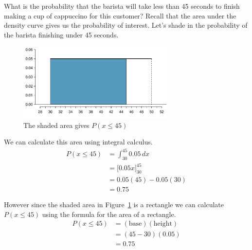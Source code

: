 \begin{example}{What is the probability that the barista will take less than 45 seconds to finish making a cup of cappuccino for this customer?}\label{UniformBaristaExampleLess45}
Recall that the area under the density curve gives us the probability of interest.
Let's shade in the probability of the barista finishing under 45 seconds.
\vspace{-0.25cm}
\begin{figure}[H]
\centering
\includegraphics[width=0.7\textwidth]{03/figures2/barista/baristaLess45/uniformBaristaLess45.pdf}
\caption{The shaded area gives $P(x\leq45)$ }
\label{uniformDistBaristaLess45}
\end{figure}
We can calculate this area using integral calculus.
\begin{align*}
P(x \leq 45)	& =	\int_{30}^{45} 0.05 \, dx		\\[1.5mm]
			& =	\big[ 0.05x \big]^{45}_{30}		\\[1.5mm]
			& =	0.05(45) - 0.05(30) 			\\[1.5mm]
			& =	0.75
\end{align*}

However since the shaded area in Figure~\ref{uniformDistBaristaLess45} is a rectangle we can
calculate $P(x\leq45)$ using the formula for the area of a rectangle.
\begin{align*}
P(x \leq 45)	& =	(\text{base})(\text{height})		\\[1.5mm]
			& =	(45-30)(0.05)				\\[1.5mm]
			& =	0.75
\end{align*}
\end{example}




